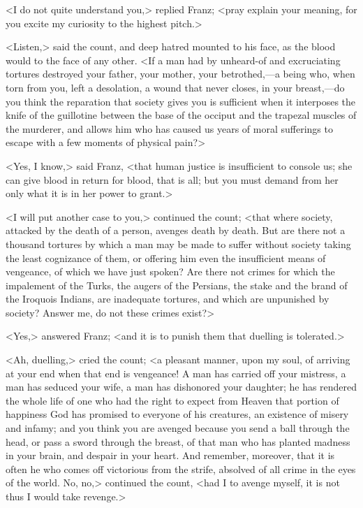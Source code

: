  <I do not quite understand you,> replied Franz; <pray explain your meaning, for you excite my curiosity to the highest pitch.> 

 <Listen,> said the count, and deep hatred mounted to his face, as the blood would to the face of any other. <If a man had by unheard-of and excruciating tortures destroyed your father, your mother, your betrothed,—a being who, when torn from you, left a desolation, a wound that never closes, in your breast,—do you think the reparation that society gives you is sufficient when it interposes the knife of the guillotine between the base of the occiput and the trapezal muscles of the murderer, and allows him who has caused us years of moral sufferings to escape with a few moments of physical pain?> 

 <Yes, I know,> said Franz, <that human justice is insufficient to console us; she can give blood in return for blood, that is all; but you must demand from her only what it is in her power to grant.> 

 <I will put another case to you,> continued the count; <that where society, attacked by the death of a person, avenges death by death. But are there not a thousand tortures by which a man may be made to suffer without society taking the least cognizance of them, or offering him even the insufficient means of vengeance, of which we have just spoken? Are there not crimes for which the impalement of the Turks, the augers of the Persians, the stake and the brand of the Iroquois Indians, are inadequate tortures, and which are unpunished by society? Answer me, do not these crimes exist?> 

 <Yes,> answered Franz; <and it is to punish them that duelling is tolerated.> 

 <Ah, duelling,> cried the count; <a pleasant manner, upon my soul, of arriving at your end when that end is vengeance! A man has carried off your mistress, a man has seduced your wife, a man has dishonored your daughter; he has rendered the whole life of one who had the right to expect from Heaven that portion of happiness God has promised to everyone of his creatures, an existence of misery and infamy; and you think you are avenged because you send a ball through the head, or pass a sword through the breast, of that man who has planted madness in your brain, and despair in your heart. And remember, moreover, that it is often he who comes off victorious from the strife, absolved of all crime in the eyes of the world. No, no,> continued the count, <had I to avenge myself, it is not thus I would take revenge.> 

